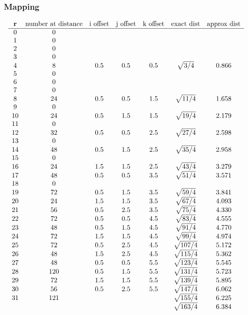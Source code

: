 \subsubsection{Mapping}
\begin{equation}
\left.\begin{array}{ccccccc}
\bf{r} & \text{number at distance} & \text{i offset} & \text{j offset} & \text{k offset} & \text{exact dist} & \text{approx dist} \\
\hline
0 & 0 & & & & & \\
1 & 0 & & & & & \\
2 & 0 & & & & & \\
3 & 0 & & & & & \\
4 & 8 & 0.5 & 0.5 & 0.5 & \sqrt{3/4} & 0.866 \\
5 & 0 & & &  & &\\
6 & 0 & & & & & \\
7 & 0 & & & & & \\
8 & 24 & 0.5 & 0.5 & 1.5 & \sqrt{11/4} & 1.658\\
9 & 0 & & & & & \\
10 & 24 & 0.5 & 1.5 & 1.5 & \sqrt{19/4} & 2.179 \\
11 & 0 & & & & & \\
12 & 32 & 0.5 & 0.5 & 2.5 & \sqrt{27/4} & 2.598 \\
13 & 0 & & & & & \\
14 & 48 & 0.5 & 1.5 & 2.5 & \sqrt{35/4} & 2.958 \\
15 & 0 & & & \\
16 & 24 & 1.5 & 1.5 & 2.5 & \sqrt{43/4} & 3.279 \\
17 & 48 & 0.5 & 0.5 & 3.5 & \sqrt{51/4} & 3.571 \\
18 & 0 & & & & & \\
19 & 72 & 0.5 & 1.5 & 3.5 & \sqrt{59/4} & 3.841 \\
20 & 24 & 1.5 & 1.5 & 3.5 & \sqrt{67/4} & 4.093 \\
21 & 56 & 0.5 & 2.5 & 3.5 & \sqrt{75/4} & 4.330 \\
22 & 72 & 0.5 & 0.5 & 4.5 & \sqrt{83/4} & 4.555 \\
23 & 48 & 0.5 & 1.5 & 4.5 & \sqrt{91/4} & 4.770 \\
24 & 72 & 1.5 & 1.5 & 4.5 & \sqrt{99/4} & 4.974 \\
25 & 72 & 0.5 & 2.5 & 4.5 & \sqrt{107/4} & 5.172 \\
26 & 48 & 1.5 & 2.5 & 4.5 & \sqrt{115/4} & 5.362 \\
27 & 48 & 0.5 & 0.5 & 5.5 & \sqrt{123/4} & 5.545 \\
28 & 120 & 0.5 & 1.5 & 5.5 & \sqrt{131/4} & 5.723 \\
29 & 72 & 1.5 & 1.5 & 5.5 & \sqrt{139/4} & 5.895 \\
30 & 56 & 0.5 & 2.5 & 5.5 & \sqrt{147/4} & 6.062 \\
31 & 121 & & & & \sqrt{155/4} & 6.225 \\
& & & & & \sqrt{163/4} & 6.384 \\
\end{array}\right.
\end{equation}

